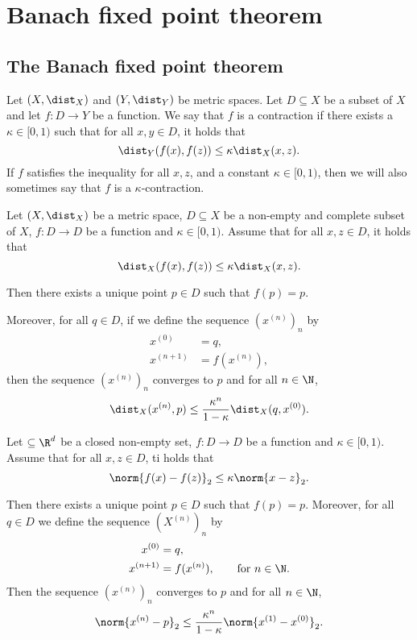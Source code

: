 \section{Banach fixed point theorem}

\subsection{The Banach fixed point theorem}
\begin{definition}[Contraction]
    Let $(X,\dist_X)$ and $(Y,\dist_Y)$ be metric spaces. Let $D \subseteq X$ be a subset of $X$ and let 
    $f:D \to Y$ be a function. We say that $f$ is a contraction if there exists a $\kappa \in [0,1)$ such that
    for all $x,y \in D$, it holds that
    $$\dist_Y(f(x),f(z)) \le \kappa\dist_X(x,z).$$
    If $f$ satisfies the inequality for all $x,z$, and a constant $\kappa \in [0,1)$, then we will also
    sometimes say that $f$ is a $\kappa$-contraction.
\end{definition}

\begin{definition}
    Let $(X,\dist_X)$ be a metric space, $D \subseteq X$ be a non-empty and complete subset of $X$,
    $f:D \to D$ be a function and $\kappa \in [0,1)$.
    Assume that for all $x,z \in D$, it holds that
    $$\dist_X(f(x),f(z)) \le \kappa\dist_X(x,z).$$

    Then there exists a unique point $p \in D$ such that $f(p) = p.$
    
    Moreover, for all $q \in D$, if we define the sequence $(x^{(n)})_n$ by
    \begin{align*}
        x^{(0)} &= q,\\
        x^{(n+1)} &= f(x^{(n)}),
    \end{align*}
    then the sequence $(x^{(n)})_n$ converges to $p$ and for all $n\in\N$,
    $$\dist_X(x^{(n)},p) \le \frac{\kappa^n}{1-\kappa}\dist_X(q,x^{(0)}).$$
\end{definition}

\begin{theorem}
    Let $\subseteq \R^d$ be a closed non-empty set, $f:D \to D$ be a function and $\kappa \in [0,1)$.
    Assume that for all $x,z \in D$, ti holds that
    $$\norm{f(x)-f(z)}_2 \le \kappa \norm{x-z}_2.$$

    Then there exists a unique point $p \in D$ such that $f(p) = p.$
    Moreover, for all $q \in D$ we define the sequence $(X^{(n)})_n$ by
    \begin{align*}
        x^{(0)} &= q,\\
        x^{(n+1)} &= f(x^{(n)}), \qquad \text{for } n \in \N.
    \end{align*}
    Then the sequence $(x^{(n)})_n$ converges to $p$ and for all $n \in \N$,
    $$\norm{x^{(n)}-p}_2 \le \frac{\kappa^n}{1-\kappa}\norm{x^{(1)}-x^{(0)}}_2.$$
\end{theorem}
